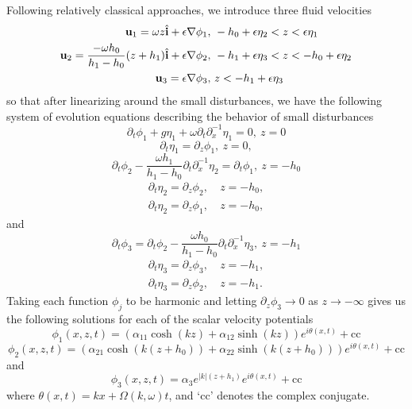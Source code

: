 \documentclass[a4paper,11pt]{article}
\newcommand{\pd}{\partial}
\begin{document}
Following relatively classical approaches, we introduce three fluid velocities
\begin{align*}
{\bf u}_{1} = \omega z \hat{{\bf i}} + \epsilon \nabla \phi_{1}, &  ~-h_{0}+\epsilon \eta_{2} < z < \epsilon \eta_{1}\\
{\bf u}_{2} = \frac{-\omega h_{0}}{h_{1}-h_{0}} (z+h_{1}) \hat{{\bf i}} + \epsilon \nabla \phi_{2}, & ~-h_{1}+\epsilon \eta_{3} < z < -h_{0}+\epsilon \eta_{2}\\
{\bf u}_{3} = \epsilon \nabla \phi_{3}, & ~z < -h_{1} + \epsilon \eta_{3}
\end{align*}    
so that after linearizing around the small disturbances, we have the following system of evolution equations describing the behavior of small disturbances
\[
\pd_{t}\phi_{1} + g\eta_{1} + \omega \pd_{t}\pd_{x}^{-1}\eta_{1} = 0, ~ z = 0 
\]
\[
\pd_{t}\eta_{1} = \pd_{z}\phi_{1}, ~ z = 0, 
\]
\[
\pd_{t}\phi_{2} - \frac{\omega h_{1}}{h_{1}-h_{0}} \pd_{t}\pd_{x}^{-1}\eta_{2} = \pd_{t}\phi_{1} , ~ z = -h_{0} 
\]
\begin{align*}
\pd_{t}\eta_{2} = \pd_{z}\phi_{2}, & ~ z = -h_{0},\\
\pd_{t}\eta_{2} = \pd_{z}\phi_{1}, & ~ z = -h_{0}, 
\end{align*}
and
\[
\pd_{t}\phi_{3} = \pd_{t}\phi_{2} - \frac{\omega h_{0}}{h_{1}-h_{0}} \pd_{t}\pd_{x}^{-1}\eta_{3}, ~ z = -h_{1} 
\]
\begin{align*}
\pd_{t}\eta_{3} = \pd_{z}\phi_{3}, & ~ z = -h_{1},\\
\pd_{t}\eta_{3} = \pd_{z}\phi_{2}, & ~ z = -h_{1}. 
\end{align*}
Taking each function $\phi_{j}$ to be harmonic and letting $\pd_{z}\phi_{3}\rightarrow 0 $ as $z\rightarrow -\infty$ gives us the following solutions for each of the scalar velocity potentials
\[
\phi_{1}(x,z,t) = \left(\alpha_{11}\cosh(kz)+\alpha_{12}\sinh(kz)\right)e^{i\theta(x,t)} + \mbox{cc}
\]
\[
\phi_{2}(x,z,t) = \left(\alpha_{21}\cosh(k(z+h_{0}))+\alpha_{22}\sinh(k(z+h_{0}))\right)e^{i\theta(x,t)} + \mbox{cc}
\]
and
\[
\phi_{3}(x,z,t) = \alpha_{3}e^{|k|(z+h_{1})}e^{i\theta(x,t)} + \mbox{cc}
\]
where $\theta(x,t) = kx + \Omega(k,\omega)t$, and `cc' denotes the complex conjugate.  
\end{document}
